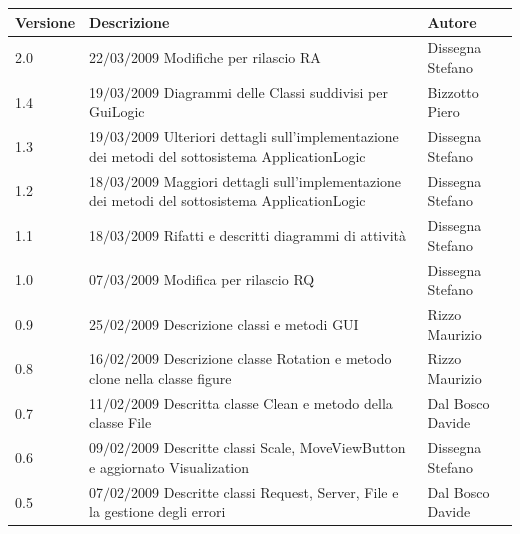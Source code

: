 \begin{center}
	\begin{table}[h]
		  \begin{tabular*}
			{1\textwidth}%
				{@{\extracolsep{\fill}}|p{}|p{}|p{}|}
			 \hline
			\textbf{Versione}  & \textbf{Descrizione} & \textbf{Autore} \\
		 \hline
        2.0 &    22$\slash$03$\slash$2009 Modifiche per rilascio RA & Dissegna Stefano \\
		\hline
        1.4 &    19$\slash$03$\slash$2009 Diagrammi delle Classi suddivisi per GuiLogic & Bizzotto Piero \\
		\hline
        1.3 &    19$\slash$03$\slash$2009 Ulteriori dettagli sull'implementazione dei metodi del sottosistema ApplicationLogic & Dissegna Stefano \\
        \hline
        1.2 &    18$\slash$03$\slash$2009 Maggiori dettagli sull'implementazione dei metodi del sottosistema ApplicationLogic & Dissegna Stefano \\
        \hline
        1.1 &    18$\slash$03$\slash$2009 Rifatti e descritti diagrammi di attivit\`a & Dissegna Stefano \\
        \hline       
        1.0 &    07$\slash$03$\slash$2009 Modifica per rilascio RQ & Dissegna Stefano \\
        \hline        
        0.9 &    25$\slash$02$\slash$2009 Descrizione classi e metodi GUI & Rizzo Maurizio \\
        \hline        
        0.8 &    16$\slash$02$\slash$2009 Descrizione classe Rotation e metodo clone nella classe figure & Rizzo Maurizio \\
        \hline        
        0.7 &    11$\slash$02$\slash$2009 Descritta classe Clean e metodo della classe File & Dal Bosco Davide \\
        \hline	
        0.6 &    09$\slash$02$\slash$2009 Descritte classi Scale, MoveViewButton e aggiornato Visualization & Dissegna Stefano \\
        \hline		
        0.5 &    07$\slash$02$\slash$2009 Descritte classi Request, Server, File e la gestione degli errori & Dal Bosco Davide \\
        \hline

\end{tabular*}
\end{table}
\end{center}

